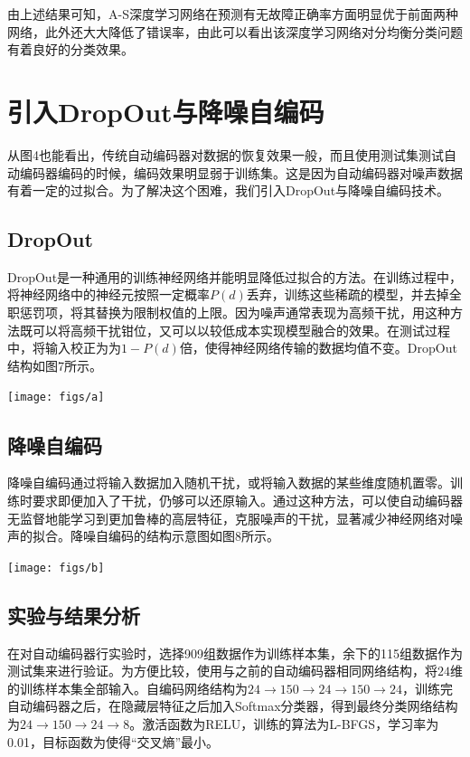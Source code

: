 \documentclass{ctacn}%
\begin{document}
\begin{multicols}{2}
由上述结果可知，A-S深度学习网络在预测有无故障正确率方面明显优于前面两种网络，此外还大大降低了错误率，由此可以看出该深度学习网络对分均衡分类问题有着良好的分类效果。

\section{引入DropOut与降噪自编码}
从图4也能看出，传统自动编码器对数据的恢复效果一般，而且使用测试集测试自动编码器编码的时候，编码效果明显弱于训练集。这是因为自动编码器对噪声数据有着一定的过拟合。为了解决这个困难，我们引入DropOut与降噪自编码技术。

\subsection{DropOut}
DropOut是一种通用的训练神经网络并能明显降低过拟合的方法。在训练过程中，将神经网络中的神经元按照一定概率$P(d)$丢弃，训练这些稀疏的模型，并去掉全职惩罚项，将其替换为限制权值的上限。因为噪声通常表现为高频干扰，用这种方法既可以将高频干扰钳位，又可以以较低成本实现模型融合的效果。在测试过程中，将输入校正为为$1-P(d)$倍，使得神经网络传输的数据均值不变。DropOut结构如图7所示。

\begin{center}
	\texttt{[image: figs/a]}\\
	\label{fig7}
\end{center}

\subsection{降噪自编码}
降噪自编码通过将输入数据加入随机干扰，或将输入数据的某些维度随机置零。训练时要求即便加入了干扰，仍够可以还原输入。通过这种方法，可以使自动编码器无监督地能学习到更加鲁棒的高层特征，克服噪声的干扰，显著减少神经网络对噪声的拟合。降噪自编码的结构示意图如图8所示。


\begin{center}
	\texttt{[image: figs/b]}\\
	\label{fig8}
\end{center}

\subsection{实验与结果分析}

在对自动编码器行实验时，选择909组数据作为训练样本集，余下的115组数据作为测试集来进行验证。为方便比较，使用与之前的自动编码器相同网络结构，将$24$维的训练样本集全部输入。自编码网络结构为$24\rightarrow150\rightarrow24\rightarrow150\rightarrow24$，训练完自动编码器之后，在隐藏层特征之后加入Softmax分类器，得到最终分类网络结构为$24\rightarrow150\rightarrow24\rightarrow8$。激活函数为RELU，训练的算法为L-BFGS，学习率为0.01，目标函数为使得“交叉熵”最小。


\end{multicols}
\end{document}
